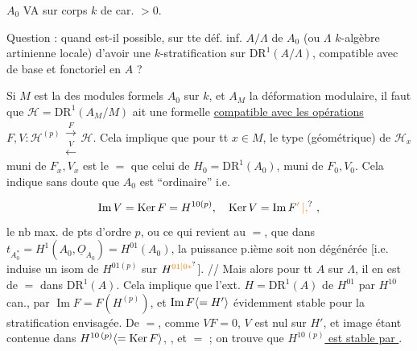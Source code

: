 $A_0$ VA sur corps $k$ de car. $>0$.

Question : quand est-il possible, sur tte déf. inf. $A/\Lambda$ de $A_0$
(ou $\Lambda$ $k$-algèbre artinienne locale) d'avoir une
$k$-stratification sur $\mathrm{DR}^1(A/\Lambda)$, compatible avec
 de base et fonctoriel en $A$ ?

Si $M$ est la  des modules formels  $A_0$ sur $k$,
 et $A_M$ la déformation modulaire, il
faut que $\mathscr H=\mathrm{DR}^1(A_M/M)$ ait une  formelle
\uline{compatible avec les opérations} $F,V:\mathscr H^{(p)}\mathrel{\substack{\xrightarrow{F}\\[-.5ex]\xleftarrow{V}}}\mathscr H$. Cela
implique que pour tt $x\in M$, le type (géométrique) de $\mathscr H_x$ muni de $F_x,V_x$ est le $=$ que
celui de $H_0=\mathrm{DR}^1(A_0)$, muni de $F_0,V_0$. Cela
indique sans doute que $A_0$ est ``ordinaire'' i.e.

\[
\operatorname{Im}V=\operatorname{Ker}F=H^{10(p)},\quad
\operatorname{Ker}V=\operatorname{Im}F\unsure{'\,|,}\ ,
\]
 le nb max. de pts d'ordre $p$, ou ce qui revient
au $=$, que dans $t_{A_0^*}=H^1(A_0,\underline O_{A_0})
=H^{01}(A_0)$, la puissance p.ième
soit non dégénérée [i.e. induise un isom de
$H^{01(p)}$ sur $H^{\unsure{01|0*}}$]. // Mais alors  pour tt $A$ sur $\Lambda$,
il en est de $=$ dans $\mathrm{DR}^1(A)$. Cela implique
que l'ext. $H=\mathrm{DR}^1(A)$ de $H^{01}$ par $H^{10}$  can.,
par $\operatorname{Im} F=F(H^{(p)})$, et  $\operatorname{Im} F\inserted{=H'}$  évidemment
stable pour la stratification envisagée. De $=$, comme $VF=0$,
$V$ est nul sur $H'$, et  image étant contenue
dans $H^{10\,(p)}\inserted{=\operatorname{Ker}F}$, ,
et $=$  ; on trouve
que \uline{$H^{10\,(p)}$ est stable par }. 

